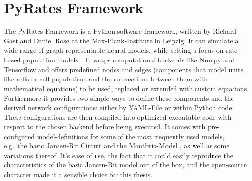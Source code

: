 
\section{PyRates Framework}\label{sec:pyrates-framework}
The PyRates Framework is a Python software framework, written by Richard Gast and Daniel Rose at
the Max-Plank-Institute in Leipzig.
It can simulate a wide range of graph-representable neural models,
while setting a focus on rate-based population models~\parencite{gast_pyratespython_2019}.
It wraps computational backends like Numpy and Tensorflow and offers predefined nodes and
edges (components that model units like cells or cell populations and the
connections between them with mathematical equations) to be used,
replaced or extended with custom equations.
Furthermore it provides two simple ways to define these components and the derived network configurations:
either by YAML-File or within Python code.
These configurations are then compiled into optimized executable code with respect to
the chosen backend before being executed.
It comes with pre-configured model-definitions for some of the most frequently used models, e.g.\ the basic
Jansen-Rit Circuit \parencite{jansen_electroencephalogram_1995} and the
Montbrio-Model \parencite{montbrio_macroscopic_2015}, as well as some variations thereof.
It's ease of use, the fact that it could easily reproduce the characteristics of
the basic Jansen-Rit model out of the box, and the open-source character made it a sensible choice for this thesis.
%
%
%
%
%
%
%
%

